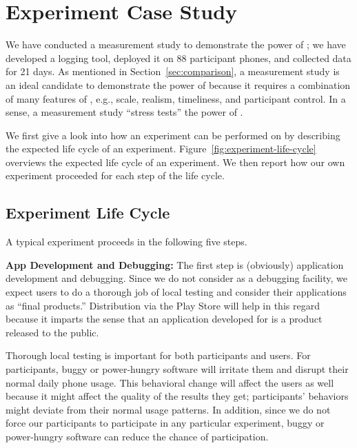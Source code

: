\section{Experiment Case Study}
\label{sec-experiment}

We have conducted a measurement study to demonstrate the power of \PhoneLab{};
we have developed a logging tool, deployed it on 88 participant phones, and
collected data for 21 days. 
As mentioned in Section~\ref{sec:comparison}, a measurement study is an ideal
candidate to demonstrate the power of \PhoneLab{} because it requires a
combination of many features of \PhoneLab{}, e.g., scale, realism, timeliness,
and participant control. In a sense, a measurement study ``stress tests'' the
power of \PhoneLab{}.

We first give a look into how an experiment can be performed on \PhoneLab{} by
describing the expected life cycle of an experiment.
Figure~\ref{fig:experiment-life-cycle} overviews the expected life cycle of an
experiment. We then report how our own experiment proceeded for each step of the
life cycle.

\subsection{Experiment Life Cycle}

A typical \PhoneLab{} experiment proceeds in the following five steps.

{\bf App Development and Debugging:} The first step is (obviously) application
development and debugging. Since we do not consider \PhoneLab{} as a debugging
facility, we expect \PhoneLab{} users to do a thorough job of local testing and
consider their applications as ``final products.'' Distribution via the Play
Store will help in this regard because it imparts the sense that an application
developed for \PhoneLab{} is a product released to the public.

Thorough local testing is important for both \PhoneLab{} participants and users.
For participants, buggy or power-hungry software will irritate them and disrupt
their normal daily phone usage. This behavioral change will affect the users as
well because it might affect the quality of the results they get; participants'
behaviors might deviate from their normal usage patterns. In addition, since we
do not force our participants to participate in any particular experiment, buggy
or power-hungry software can reduce the chance of participation.

